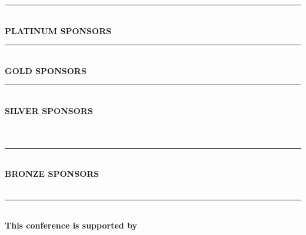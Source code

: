 \begin{center}
\rule{12cm}{1pt}\\[12pt]


\textsf{\textbf{\Large PLATINUM SPONSORS}}\\

\hspace{\separationwidth}

\vspace{5mm}
\rule{12cm}{1pt}\\[12pt]
\textsf{\textbf{\Large GOLD SPONSORS}}\\[5mm]

\vspace{5mm}
\rule{12cm}{1pt}\\[12pt]
\textsf{\textbf{\LARGE SILVER SPONSORS}}\\[5mm]

\hspace{\separationwidth}
\\
\vspace{\separationwidth}
\hspace{\separationwidth}
\\
\vspace{\separationwidth}
\hspace{\separationwidth}
\hspace{\separationwidth}

\vspace{5mm}
\rule{12cm}{1pt}\\[12pt]
\textsf{\textbf{\Large BRONZE SPONSORS}}\\[5mm]
\hspace{\separationwidth}
\hspace{\separationwidth}
\\
\vspace{\separationwidth}
\hspace{\separationwidth}

\vspace{4mm}
\rule{12cm}{1pt}\\[12pt]
\textsf{\textbf{ This conference is supported by}}\\
\vspace{2mm}


\end{center}
